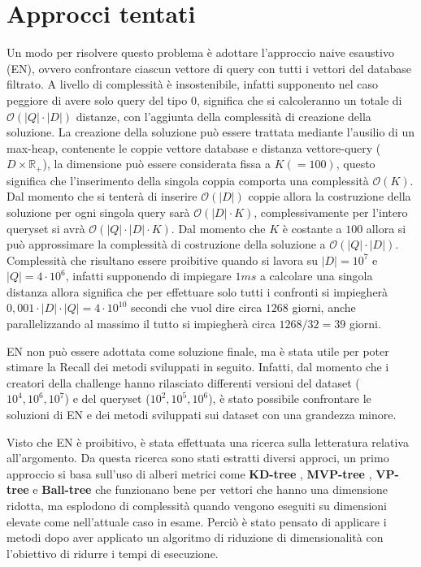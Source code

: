 \section{Approcci tentati}
Un modo per risolvere questo problema è adottare l'approccio naive esaustivo (EN), ovvero 
confrontare ciascun vettore di query con tutti i vettori del database filtrato. 
A livello di complessità è insostenibile, infatti supponento nel caso peggiore 
di avere solo query del tipo $0$, significa che si calcoleranno un totale di 
$\mathcal{O}(|Q| \cdot |D|)$ distanze, con l'aggiunta della complessità di creazione
della soluzione. La creazione della soluzione può essere trattata mediante l'ausilio 
di un max-heap, contenente le coppie vettore database e distanza vettore-query ($D\times \mathbb{R}_+$),
la dimensione può essere considerata fissa a $K(=100)$, questo significa che l'inserimento 
della singola coppia comporta una complessità $\mathcal{O}(K)$. Dal momento che 
si tenterà di inserire $\mathcal{O}(|D|)$ coppie allora la costruzione della 
soluzione per ogni singola query sarà $\mathcal{O}(|D|\cdot K)$, complessivamente per l'intero 
queryset si avrà $\mathcal{O}(|Q| \cdot |D|\cdot K)$. Dal momento che $K$ è costante 
a $100$ allora si può approssimare la complessità di costruzione della soluzione 
a  $\mathcal{O}(|Q| \cdot |D|)$. Complessità che risultano essere proibitive quando 
si lavora su $|D|= 10^7$ e $|Q|= 4\cdot 10^6$, infatti supponendo di impiegare $1ms$ 
a calcolare una singola distanza allora significa che per effettuare solo tutti i 
confronti si impiegherà $0,001 \cdot |D| \cdot |Q| = 4\cdot 10^{10}$
secondi che vuol dire circa $1268$ giorni, anche parallelizzando al massimo 
il tutto si impiegherà circa $1268/32 = 39$ giorni. 

EN non può essere adottata come soluzione finale, ma è stata utile per poter 
stimare la Recall dei metodi sviluppati in seguito. Infatti, dal momento che i 
creatori della challenge hanno rilasciato differenti versioni del dataset ($10^4, 10^6, 10^7$) e del 
queryset ($10^2, 10^5, 10^6$), è stato possibile confrontare le soluzioni di EN
e dei metodi sviluppati sui dataset con una grandezza minore. 

Visto che EN è proibitivo, è stata effettuata una ricerca sulla letteratura 
relativa all'argomento. Da questa ricerca sono stati estratti diversi approci, 
un primo approccio si basa sull'uso di alberi metrici come \textbf{KD-tree} \cite{kd_tree}, \textbf{MVP-tree}
\cite{mvp_tree1} \cite{mvp_tree2}, \textbf{VP-tree} \cite{vp_tree} e \textbf{Ball-tree} \cite{ball_tree}
che funzionano bene per vettori che hanno una dimensione ridotta, ma esplodono 
di complessità quando vengono eseguiti su dimensioni elevate come nell'attuale 
caso in esame. Perciò è stato pensato di applicare i metodi dopo aver applicato 
un algoritmo di riduzione di dimensionalità con l'obiettivo di ridurre 
i tempi di esecuzione.

